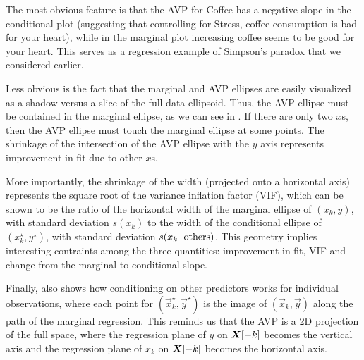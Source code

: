 The most obvious feature is that the AVP for Coffee has a negative slope in the conditional
plot (suggesting that controlling for Stress, coffee consumption is bad for your heart), while
in the marginal plot increasing coffee seems to be good for your heart. This serves as a
regression example of Simpson's paradox that we considered earlier.

Less obvious is the fact that 
the marginal and AVP ellipses are easily visualized as a shadow versus a slice of the full data ellipsoid. 
Thus, the AVP ellipse must be contained in the marginal ellipse, as we can see in .
If there are only two $x$s, then the AVP ellipse must touch the marginal ellipse at some points. 
The shrinkage of the intersection of the AVP ellipse with the $y$ axis represents improvement in fit due to other $x$s.

More importantly, the shrinkage of the width (projected onto a horizontal axis) represents the 
square root of the variance inflation factor (VIF), which can be shown to be the ratio of the horizontal
width of the marginal ellipse of $(x_k, y)$, with standard deviation $s(x_k)$ to the width of the conditional
ellipse of $(x_k^\star, y^\star)$, with standard deviation $s(x_k \, | \, \textrm{others})$.
This geometry implies interesting contraints among the three quantities: improvement in fit, VIF and change from the marginal to conditional slope.

Finally,  also shows how conditioning on other predictors works for individual
observations, where each point for  $(\vec{x}_k^\star, \vec{y}^\star)$ is the image of $(\vec{x}_k, \vec{y})$ 
along the path of the marginal regression. This reminds us that the AVP is a 2D projection of the full space,
where the regression plane of $y$ on $\bm{X}[-k]$ becomes the vertical axis and 
the regression plane of $x_k$ on $\bm{X}[-k]$ becomes the horizontal axis.

